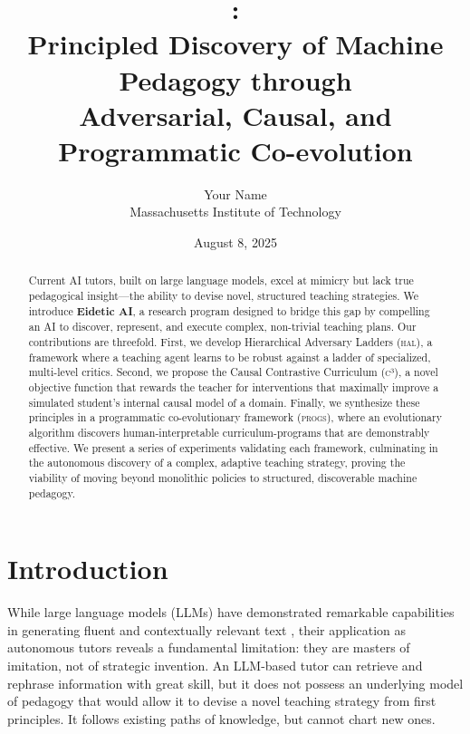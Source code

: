 \documentclass[11pt, letterpaper]{article}
\title{
  \textbf{\huge \eideticai:}\\[0.2cm]
  \Large Principled Discovery of Machine Pedagogy through\\Adversarial, Causal, and Programmatic Co-evolution
}
\author{Your Name \\ Massachusetts Institute of Technology}
\date{August 8, 2025}
\newcommand{\framework}[1]{\textsc{#1}}
\newcommand{\hal}{\framework{hal}}
\newcommand{\ccc}{\framework{c³}}
\newcommand{\progs}{\framework{progs}}
\begin{document}
\maketitle

\begin{abstract}
\noindent Current AI tutors, built on large language models, excel at mimicry but lack true pedagogical insight---the ability to devise novel, structured teaching strategies. We introduce \textbf{Eidetic AI}, a research program designed to bridge this gap by compelling an AI to discover, represent, and execute complex, non-trivial teaching plans. Our contributions are threefold. First, we develop Hierarchical Adversary Ladders (\hal{}), a framework where a teaching agent learns to be robust against a ladder of specialized, multi-level critics. Second, we propose the Causal Contrastive Curriculum (\ccc{}), a novel objective function that rewards the teacher for interventions that maximally improve a simulated student's internal causal model of a domain. Finally, we synthesize these principles in a programmatic co-evolutionary framework (\progs{}), where an evolutionary algorithm discovers human-interpretable curriculum-programs that are demonstrably effective. We present a series of experiments validating each framework, culminating in the autonomous discovery of a complex, adaptive teaching strategy, proving the viability of moving beyond monolithic policies to structured, discoverable machine pedagogy.
\end{abstract}

\section{Introduction}
While large language models (LLMs) have demonstrated remarkable capabilities in generating fluent and contextually relevant text \cite{vaswani2017attention}, their application as autonomous tutors reveals a fundamental limitation: they are masters of imitation, not of strategic invention. An LLM-based tutor can retrieve and rephrase information with great skill, but it does not possess an underlying model of pedagogy that would allow it to devise a novel teaching strategy from first principles. It follows existing paths of knowledge, but cannot chart new ones.
\end{document}
